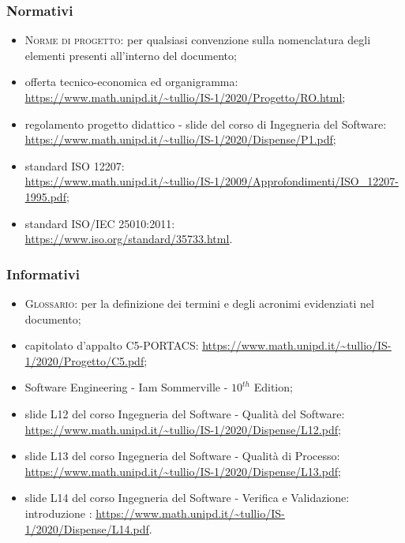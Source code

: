     \subsubsection{Normativi}
    \begin{itemize}
    	\item \textsc{Norme di progetto}: per qualsiasi convenzione sulla nomenclatura degli elementi presenti all'interno del documento;
    	\item offerta tecnico-economica ed organigramma: \newline  \uline{\url{https://www.math.unipd.it/~tullio/IS-1/2020/Progetto/RO.html}}; %
    	\item regolamento progetto didattico - slide del corso di Ingegneria del Software: \newline \uline{\url{https://www.math.unipd.it/~tullio/IS-1/2020/Dispense/P1.pdf}};
        \item standard ISO 12207:\\ \uline{\url{https://www.math.unipd.it/~tullio/IS-1/2009/Approfondimenti/ISO_12207-1995.pdf}};
        \item standard ISO/IEC 25010:2011:\\
        \uline{\url{https://www.iso.org/standard/35733.html}}.
    \end{itemize}

    \subsubsection{Informativi}
    \begin{itemize}
    	\item \textsc{Glossario}: per la definizione dei termini e degli acronimi evidenziati nel documento;
    	\item capitolato d'appalto C5-PORTACS: \newline
    	\uline{\url{https://www.math.unipd.it/~tullio/IS-1/2020/Progetto/C5.pdf}};
       	\item Software Engineering - Iam Sommerville - $10^{th}$ Edition;
        \item slide L12 del corso Ingegneria del Software - Qualità del Software:\newline
        \uline{\url{https://www.math.unipd.it/~tullio/IS-1/2020/Dispense/L12.pdf}};
        \item slide L13 del corso Ingegneria del Software - Qualità di Processo:\newline
        \uline{\url{https://www.math.unipd.it/~tullio/IS-1/2020/Dispense/L13.pdf}};
        \item slide L14 del corso Ingegneria del Software - Verifica e Validazione: introduzione :\newline
        \uline{\url{https://www.math.unipd.it/~tullio/IS-1/2020/Dispense/L14.pdf}}.
    \end{itemize}